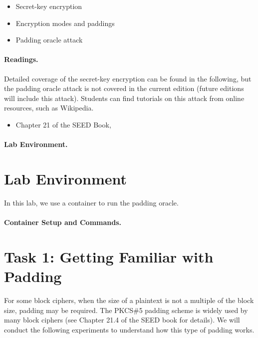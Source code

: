 \begin{itemize}[noitemsep]
\item Secret-key encryption
\item Encryption modes and paddings
\item Padding oracle attack
\end{itemize}


\paragraph{Readings.}
Detailed coverage of the secret-key encryption can be found in the following,
but the padding oracle attack is not covered in the current edition
(future editions will include this attack). Students can find tutorials
on this attack from online resources, such as Wikipedia.

\begin{itemize}
\item Chapter 21 of the SEED Book, \seedbook
\end{itemize}


\paragraph{Lab Environment.} \seedenvironmentC


\section{Lab Environment}

In this lab, we use a container to run the padding oracle. 


\paragraph{Container Setup and Commands.}



\section{Task 1: Getting Familiar with Padding}

For some block ciphers, when the size of a plaintext is not a multiple
of the block size, padding may be required.
The PKCS\#5 padding scheme is widely used by many block
ciphers (see Chapter 21.4 of the SEED book for details).
We will conduct the following experiments to
understand how this type of padding works.


